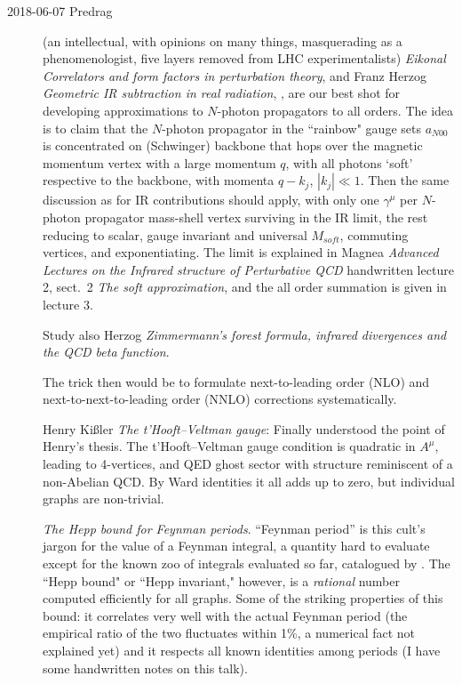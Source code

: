 \begin{description}
\item[2018-06-07 Predrag]

 (an intellectual,
with opinions on many things, masquerading as a phenomenologist, five
layers removed from LHC experimentalists) {\em Eikonal Correlators and
form factors in perturbation theory},
and
{Franz Herzog} {\em Geometric IR subtraction in real radiation},
, are our best
shot for developing approximations to $N$-photon propagators to all orders.
The idea is to claim that the $N$-photon propagator in the ``rainbow"
gauge sets $a_{N00}$ is concentrated on (Schwinger) backbone that hops
over the magnetic momentum vertex with a large momentum $q$, with all photons
`soft' respective to the backbone, with momenta $q-k_j$, $|k_j|\ll 1$.
Then the same discussion as for IR contributions should apply, with
only one $\gamma^\mu$ per $N$-photon propagator mass-shell vertex
surviving in the IR limit, the rest reducing to scalar, gauge invariant
and universal $M_{soft}$, commuting
vertices, and exponentiating. The limit is explained in Magnea
{\em Advanced Lectures on the Infrared structure of Perturbative QCD}
handwritten
 {lecture 2},
sect.~2 {\em The soft approximation}, and the all order summation
is given in
 {lecture 3}.

Study also Herzog
{\em Zimmermann's forest formula, infrared divergences and the {QCD} beta function}.

The trick then would be to formulate  next-to-leading order (NLO) and
next-to-next-to-leading order (NNLO) corrections systematically.



{Henry Ki{\ss}ler} {\em The t'Hooft–Veltman gauge}:
Finally understood the point of Henry's thesis. The t'Hooft–Veltman gauge
condition is quadratic in $A^\mu$, leading to 4-vertices, and QED ghost
sector with structure reminiscent of a non-Abelian QCD.  By Ward
identities it all adds up to zero, but individual graphs are non-trivial.

 {\em The Hepp
bound for Feynman periods}. ``Feynman period'' is this cult's jargon for
the value of a Feynman integral, a quantity hard to evaluate except for
the known zoo of integrals evaluated so far, catalogued by
. The ``Hepp bound" or ``Hepp invariant," however,
is a \emph{rational} number computed efficiently for all graphs. Some of
the striking properties of this bound: it correlates very well with the
actual Feynman period (the empirical ratio of the two fluctuates within
1\%, a numerical fact not explained yet) and it respects all known
identities among periods  (I have some handwritten notes on this talk).


\end{description}
